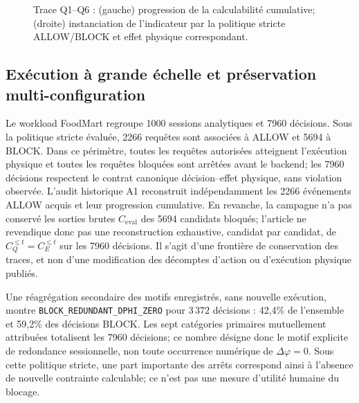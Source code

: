 \documentclass[journal]{IEEEtran}
\begin{document}
\begin{figure}[!t]
\centering
\begin{minipage}[t]{0.49\textwidth}\centering\end{minipage}\hfill
\begin{minipage}[t]{0.49\textwidth}\centering\end{minipage}
\caption{Trace Q1--Q6 : (gauche) progression de la calculabilité cumulative; (droite) instanciation de l'indicateur par la politique stricte ALLOW/BLOCK et effet physique correspondant.}
\label{fig:decision-trace}
\end{figure}

\subsection{Exécution à grande échelle et préservation multi-configuration}

Le workload FoodMart regroupe 1000 sessions analytiques et 7960 décisions. Sous la politique stricte évaluée, 2266 requêtes sont associées à ALLOW et 5694 à BLOCK. Dans ce périmètre, toutes les requêtes autorisées atteignent l'exécution physique et toutes les requêtes bloquées sont arrêtées avant le backend; les 7960 décisions respectent le contrat canonique décision--effet physique, sans violation observée. L'audit historique A1 reconstruit indépendamment les 2266 événements ALLOW acquis et leur progression cumulative. En revanche, la campagne n'a pas conservé les sorties brutes $C_{\mathrm{eval}}$ des 5694 candidats bloqués; l'article ne revendique donc pas une reconstruction exhaustive, candidat par candidat, de $C_Q^{\le t}=C_E^{\le t}$ sur les 7960 décisions. Il s'agit d'une frontière de conservation des traces, et non d'une modification des décomptes d'action ou d'exécution physique publiés.

Une réagrégation secondaire des motifs enregistrés, sans nouvelle exécution, montre \texttt{BLOCK\_REDUNDANT\_DPHI\_ZERO} pour $3\,372$ décisions : 42,4\% de l'ensemble et 59,2\% des décisions BLOCK. Les sept catégories primaires mutuellement attribuées totalisent les 7960 décisions; ce nombre désigne donc le motif explicite de redondance sessionnelle, non toute occurrence numérique de $\Delta\varphi=0$. Sous cette politique stricte, une part importante des arrêts correspond ainsi à l'absence de nouvelle contrainte calculable; ce n'est pas une mesure d'utilité humaine du blocage.
\end{document}
